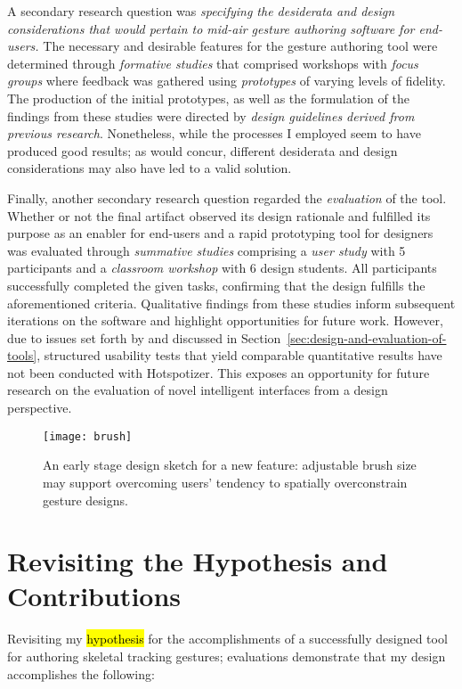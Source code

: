 A secondary research question was \emph{specifying the desiderata and design considerations that would pertain to mid-air gesture authoring software for end-users.} The necessary and desirable features for the gesture authoring tool were determined through \emph{formative studies} that comprised workshops with \emph{focus groups} where feedback was gathered using \emph{prototypes} of varying levels of fidelity. The production of the initial prototypes, as well as the formulation of the findings from these studies were directed by \emph{design guidelines derived from previous research}. Nonetheless, while the processes I employed seem to have produced good results; as \textcite{Zimmerman:2007} would concur, different desiderata and design considerations may also have led to a valid solution.

Finally, another secondary research question regarded the \emph{evaluation} of the tool. Whether or not the final artifact observed its design rationale and fulfilled its purpose as an enabler for end-users and a rapid prototyping tool for designers was evaluated through \emph{summative studies} comprising a \emph{user study} with 5 participants and a \emph{classroom workshop} with 6 design students. All participants successfully completed the given tasks, confirming that the design fulfills the aforementioned criteria. Qualitative findings from these studies inform subsequent iterations on the software and highlight opportunities for future work. However, due to issues set forth by \textcite{Olsen:2007} and discussed in Section~\ref{sec:design-and-evaluation-of-tools}, structured usability tests that yield comparable quantitative results have not been conducted with Hotspotizer. This exposes an opportunity for future research on the evaluation of novel intelligent interfaces from a design perspective.

\begin{SCfigure}[\sidecaptionrelwidth][t]
\centering
\texttt{[image: brush]}
\caption{An early stage design sketch for a new feature: adjustable brush size may support overcoming users' tendency to spatially overconstrain gesture designs.}
\label{fig:brush}
\end{SCfigure}

\section{Revisiting the Hypothesis and Contributions}

Revisiting my \hl{hypothesis} for the accomplishments of a successfully designed tool for authoring skeletal tracking gestures; evaluations demonstrate that my design accomplishes the following:

